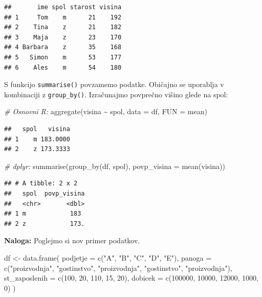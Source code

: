 \documentclass[
]{book}
\newenvironment{Shaded}{\begin{snugshade}}{\end{snugshade}}
\newcommand{\AttributeTok}[1]{\textcolor[rgb]{0.77,0.63,0.00}{#1}}
\newcommand{\CommentTok}[1]{\textcolor[rgb]{0.56,0.35,0.01}{\textit{#1}}}
\newcommand{\DecValTok}[1]{\textcolor[rgb]{0.00,0.00,0.81}{#1}}
\newcommand{\FunctionTok}[1]{\textcolor[rgb]{0.00,0.00,0.00}{#1}}
\newcommand{\NormalTok}[1]{#1}
\newcommand{\OtherTok}[1]{\textcolor[rgb]{0.56,0.35,0.01}{#1}}
\newcommand{\SpecialCharTok}[1]{\textcolor[rgb]{0.00,0.00,0.00}{#1}}
\newcommand{\StringTok}[1]{\textcolor[rgb]{0.31,0.60,0.02}{#1}}
\begin{document}
\begin{verbatim}
##       ime spol starost visina
## 1     Tom    m      21    192
## 2    Tina    z      21    182
## 3    Maja    z      23    170
## 4 Barbara    z      35    168
## 5   Simon    m      53    177
## 6    Ales    m      54    180
\end{verbatim}

S funkcijo \texttt{summarise()} povzamemo podatke. Običajno se uporablja v kombinaciji z \texttt{group\_by()}. Izračunajmo povprečno višino glede na spol:

\begin{Shaded}
\begin{Highlighting}[]
\CommentTok{\# Osnovni R:}
\FunctionTok{aggregate}\NormalTok{(visina }\SpecialCharTok{\textasciitilde{}}\NormalTok{ spol, }\AttributeTok{data =}\NormalTok{ df, }\AttributeTok{FUN =}\NormalTok{ mean)}
\end{Highlighting}
\end{Shaded}

\begin{verbatim}
##   spol   visina
## 1    m 183.0000
## 2    z 173.3333
\end{verbatim}

\begin{Shaded}
\begin{Highlighting}[]
\CommentTok{\# dplyr:}
\FunctionTok{summarise}\NormalTok{(}\FunctionTok{group\_by}\NormalTok{(df, spol), }\AttributeTok{povp\_visina =} \FunctionTok{mean}\NormalTok{(visina))}
\end{Highlighting}
\end{Shaded}

\begin{verbatim}
## # A tibble: 2 x 2
##   spol  povp_visina
##   <chr>       <dbl>
## 1 m            183 
## 2 z            173.
\end{verbatim}

\textbf{Naloga:} Poglejmo si nov primer podatkov.

\begin{Shaded}
\begin{Highlighting}[]
\NormalTok{df }\OtherTok{\textless{}{-}} \FunctionTok{data.frame}\NormalTok{(}
  \AttributeTok{podjetje =} \FunctionTok{c}\NormalTok{(}\StringTok{"A"}\NormalTok{, }\StringTok{"B"}\NormalTok{, }\StringTok{"C"}\NormalTok{, }\StringTok{"D"}\NormalTok{, }\StringTok{"E"}\NormalTok{),}
  \AttributeTok{panoga =} \FunctionTok{c}\NormalTok{(}\StringTok{"proizvodnja"}\NormalTok{, }\StringTok{"gostinstvo"}\NormalTok{, }\StringTok{"proizvodnja"}\NormalTok{, }\StringTok{"gostinstvo"}\NormalTok{, }\StringTok{"proizvodnja"}\NormalTok{),}
  \AttributeTok{st\_zaposlenih =} \FunctionTok{c}\NormalTok{(}\DecValTok{100}\NormalTok{, }\DecValTok{20}\NormalTok{, }\DecValTok{110}\NormalTok{, }\DecValTok{15}\NormalTok{, }\DecValTok{20}\NormalTok{),}
  \AttributeTok{dobicek =} \FunctionTok{c}\NormalTok{(}\DecValTok{100000}\NormalTok{, }\DecValTok{10000}\NormalTok{, }\DecValTok{12000}\NormalTok{, }\DecValTok{1000}\NormalTok{, }\DecValTok{0}\NormalTok{)}
\NormalTok{)}
\end{Highlighting}
\end{Shaded}
\end{document}
